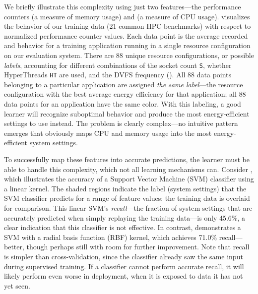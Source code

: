 We briefly illustrate this complexity using just two features---the performance counters  (a measure of memory usage) and  (a measure of CPU usage).
 visualizes the behavior of our training data (21 common HPC benchmarks) with respect to normalized performance counter values.
Each data point is the average recorded  and  behavior for a training application running in a single resource configuration on our evaluation system.
There are 88 unique resource configurations, or possible \emph{labels}, accounting for different combinations of the socket count \texttt{S}, whether HyperThreads \texttt{HT} are used, and the DVFS frequency (\GHz).
All 88 data points belonging to a particular application are assigned \emph{the same label}---the resource configuration with the best average energy efficiency for that application; \ie all 88 data points for an application have the same color.
With this labeling, a good learner will recognize suboptimal behavior and produce the most energy-efficient settings to use instead.
The problem is clearly complex---no intuitive pattern emerges that obviously maps CPU and memory usage into the most energy-efficient system settings.

To successfully map these features into accurate predictions, the learner must be able to handle this complexity, which not all learning mechanisms can.
Consider , which illustrates the accuracy of a Support Vector Machine (SVM) classifier using a linear kernel.
The shaded regions indicate the label (system settings) that the SVM classifier predicts for a range of feature values; the training data is overlaid for comparison.
This linear SVM's \emph{recall}---the fraction of system settings that are accurately predicted when simply replaying the training data---is only 45.6\%, a clear indication that this classifier is not effective.
In contrast,  demonstrates a SVM with a radial basis function (RBF) kernel, which achieves 71.0\% recall---better, though perhaps still with room for further improvement.
Note that recall is simpler than cross-validation, since the classifier already saw the same input during supervised training.
If a classifier cannot perform accurate recall, it will likely perform even worse in deployment, when it is exposed to data it has not yet seen.
